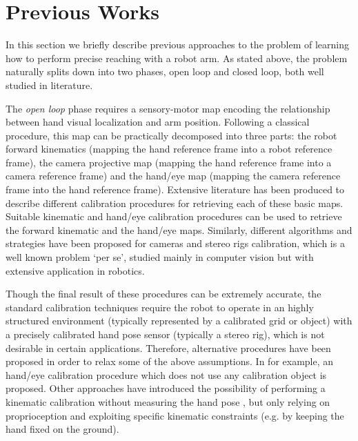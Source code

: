 \section{Previous Works}



In this section we briefly describe previous approaches to the problem of 
learning how to perform precise reaching with a robot arm. As stated above, the problem 
naturally splits down into two phases, open loop and closed loop, both well 
studied in literature.

The {\em open loop} phase requires a sensory-motor map encoding the relationship between hand visual localization and arm position. Following a classical procedure, this map can be practically decomposed into three parts: the robot forward kinematics (mapping the hand reference frame into a robot reference frame), the camera projective map (mapping the hand reference frame into a camera reference frame) and the hand/eye map (mapping the camera reference frame into the hand reference frame). Extensive literature has been produced to describe different calibration procedures for retrieving each of these basic maps. Suitable kinematic \cite{Hollerbach96calibration} and hand/eye \cite{Tsai88calibration} calibration procedures can be used to retrieve the forward kinematic and the hand/eye maps. Similarly, different algorithms and strategies have been proposed for cameras and stereo rigs calibration, which is a well known problem `per se', studied mainly in computer vision \cite{Soatto03vision} but with extensive application in robotics. 

Though the final result of these procedures can be extremely accurate, the standard calibration techniques require the robot to operate in an highly structured environment (typically represented by a calibrated grid or object) with a precisely calibrated hand pose sensor (typically a stereo rig), which is not desirable in certain applications. Therefore, alternative procedures have been proposed in order to relax some of the above assumptions. In \cite{AHE01} for example, an hand/eye calibration procedure which does not use any calibration object is proposed. Other approaches have introduced the possibility of performing a kinematic calibration without measuring the hand pose \cite{Bennett91calibration}, but only relying on proprioception and exploiting specific kinematic constraints (e.g. by keeping the hand fixed on the ground).

